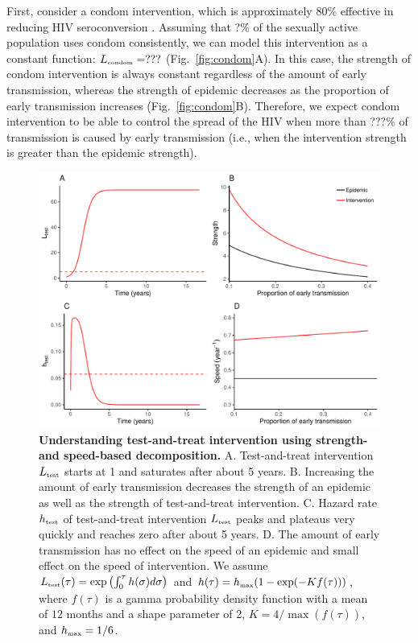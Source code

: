 \documentclass{article}\usepackage[]{graphicx}\usepackage[]{color}
\newcommand{\tsub}[2]{#1_{{\textrm{\tiny #2}}}}
\newcommand{\figref}[1]{Fig.~\ref{fig:#1}}
\newcommand{\figlab}[1]{\label{fig:#1}}
\begin{document}
First, consider a condom intervention, which is approximately 80\% effective in reducing HIV seroconversion \citep{weller2002condom}.
Assuming that ?\% of the sexually active population uses condom consistently,
we can model this intervention as a constant function: $\tsub{L}{condom} = ???$ (\figref{condom}A).
In this case, the strength of condom intervention is always constant regardless of the amount of early transmission, whereas the strength of epidemic decreases as the proportion of early transmission increases (\figref{condom}B).
Therefore, we expect condom intervention to be able to control the spread of the HIV when more than ???\% of transmission is caused by early transmission (i.e., when the intervention strength is greater than the epidemic strength).


\begin{figure}[!t]
\includegraphics[width=\textwidth]{../figure/figure3.pdf}
\caption{
\textbf{Understanding test-and-treat intervention using strength- and speed-based decomposition.}
A. Test-and-treat intervention $\tsub{L}{test}$ starts at 1 and saturates after about 5 years.
B. Increasing the amount of early transmission decreases the strength of an epidemic as well as the strength of test-and-treat intervention.
C. Hazard rate $\tsub{h}{test}$ of test-and-treat intervention $\tsub{L}{test}$ peaks and plateaus very quickly and reaches zero after about 5 years.
D. The amount of early transmission has no effect on the speed of an epidemic and small effect on the speed of intervention.
We assume $\tsub{L}{test}(\tau) = \exp\left(\int_0^\tau h(\sigma) d\sigma \right)$ and $h(\tau) = \tsub{h}{max} (1 - \exp(- K f(\tau)))$, where $f(\tau)$ is a gamma probability density function with a mean of $12$ months and a shape parameter of 2, $K = 4/\max(f(\tau))$, and $\tsub{h}{max} = 1/6$.
}
\figlab{test}
\end{figure}
\end{document}
